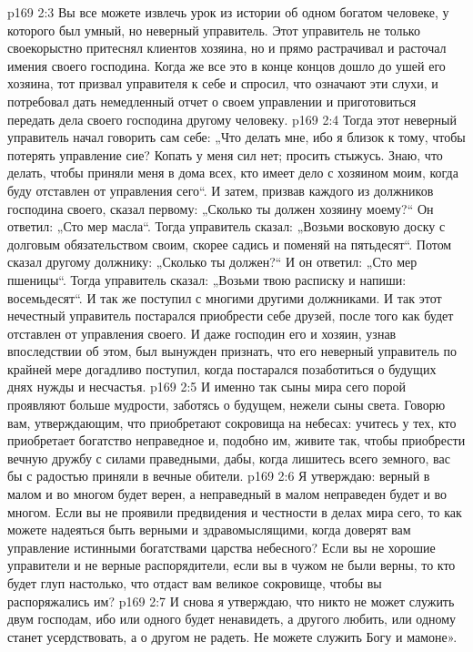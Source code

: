 \vs p169 2:3 Вы все можете извлечь урок из истории об одном богатом человеке, у которого был умный, но неверный управитель. Этот управитель не только своекорыстно притеснял клиентов хозяина, но и прямо растрачивал и расточал имения своего господина. Когда же все это в конце концов дошло до ушей его хозяина, тот призвал управителя к себе и спросил, что означают эти слухи, и потребовал дать немедленный отчет о своем управлении и приготовиться передать дела своего господина другому человеку.
\vs p169 2:4 Тогда этот неверный управитель начал говорить сам себе: „Что делать мне, ибо я близок к тому, чтобы потерять управление сие? Копать у меня сил нет; просить стыжусь. Знаю, что делать, чтобы приняли меня в дома всех, кто имеет дело с хозяином моим, когда буду отставлен от управления сего“. И затем, призвав каждого из должников господина своего, сказал первому: „Сколько ты должен хозяину моему?“ Он ответил: „Сто мер масла“. Тогда управитель сказал: „Возьми восковую доску с долговым обязательством своим, скорее садись и поменяй на пятьдесят“. Потом сказал другому должнику: „Сколько ты должен?“ И он ответил: „Сто мер пшеницы“. Тогда управитель сказал: „Возьми твою расписку и напиши: восемьдесят“. И так же поступил с многими другими должниками. И так этот нечестный управитель постарался приобрести себе друзей, после того как будет отставлен от управления своего. И даже господин его и хозяин, узнав впоследствии об этом, был вынужден признать, что его неверный управитель по крайней мере догадливо поступил, когда постарался позаботиться о будущих днях нужды и несчастья.
\vs p169 2:5 И именно так сыны мира сего порой проявляют больше мудрости, заботясь о будущем, нежели сыны света. Говорю вам, утверждающим, что приобретают сокровища на небесах: учитесь у тех, кто приобретает богатство неправедное и, подобно им, живите так, чтобы приобрести вечную дружбу с силами праведными, дабы, когда лишитесь всего земного, вас бы с радостью приняли в вечные обители.
\vs p169 2:6 Я утверждаю: верный в малом и во многом будет верен, а неправедный в малом неправеден будет и во многом. Если вы не проявили предвидения и честности в делах мира сего, то как можете надеяться быть верными и здравомыслящими, когда доверят вам управление истинными богатствами царства небесного? Если вы не хорошие управители и не верные распорядители, если вы в чужом не были верны, то кто будет глуп настолько, что отдаст вам великое сокровище, чтобы вы распоряжались им?
\vs p169 2:7 И снова я утверждаю, что никто не может служить двум господам, ибо или одного будет ненавидеть, а другого любить, или одному станет усердствовать, а о другом не радеть. Не можете служить Богу и мамоне».
